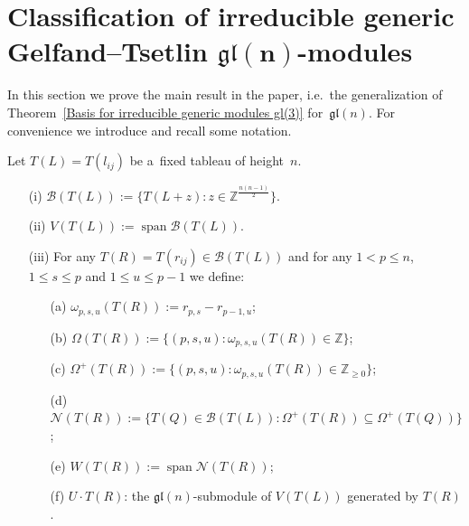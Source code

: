 \documentclass[11pt]{article}
\DeclareMathOperator\Span{span} \DeclareMathOperator\Ker{Ker}
\numberwithin{equation}{section}
\begin{document}
\section[Classif\/ication of irreducible generic Gelfand--Tsetlin $\mathfrak{gl}(n)$-modules]{Classif\/ication of irreducible generic\\
Gelfand--Tsetlin $\boldsymbol{\mathfrak{gl}(n)}$-modules}
\label{section6}

In this section we prove the main result in the paper, i.e.~the generalization of Theorem~\ref{Basis for irreducible
generic modules gl(3)} for~$\mathfrak{gl}(n)$.
For convenience we introduce and recall some notation.

\begin{Notation}
\label{notation}
Let $T(L)=T(l_{ij})$ be a~f\/ixed tableau of height~$n$.
\begin{itemize}\itemsep=0pt
\item[(i)] $\mathcal{B}(T(L)):=\big\{T(L+z): z\in \mathbb{Z}^{\frac{n(n-1)}{2}}\big\}$.
\item[(ii)] $V(T(L)):= \Span \mathcal{B}(T(L))$.
\item[(iii)] For any $T(R)=T(r_{ij})\in \mathcal{B}(T(L))$ and for any $1<p\leq n$, $1\leq s\leq p$ and $1\leq u\leq
p-1$ we def\/ine:
\begin{itemize}\itemsep=0pt
\item[(a)] $\omega_{p,s,u}(T(R)):=r_{p,s}-r_{p-1,u}$;
\item[(b)] $\Omega(T(R)):=\{(p,s,u): \omega_{p,s,u}(T(R))\in \mathbb{Z}\}$;
\item[(c)] $\Omega^{+}(T(R)):=\{(p,s,u): \omega_{p,s,u}(T(R))\in \mathbb{Z}_{\geq 0}\}$;
\item[(d)] $\mathcal{N}(T(R)):=\{T(Q)\in \mathcal{B}(T(L)): \Omega^{+}(T(R))\subseteq \Omega^{+}(T(Q))\}$;
\item[(e)] $ W(T(R)):=\Span \mathcal{N}(T(R))$;
\item[(f)] $U\cdot T(R)$: the $\mathfrak{gl}(n)$-submodule of $V(T(L))$ generated by $T(R)$.
\end{itemize}
\end{itemize}
\end{Notation}
\end{document}
